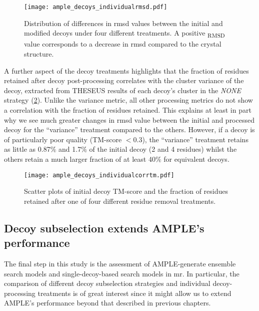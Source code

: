 \begin{figure}[H]
	\centering
	\texttt{[image: ample\_decoys\_individualrmsd.pdf]}
        \caption[Difference in RMSD for individually processed decoys]{Distribution of differences in \gls{rmsd} values between the initial and modified decoys under four different treatments. A positive \textDelta\textsubscript{RMSD} value corresponds to a decrease in \gls{rmsd} compared to the crystal structure.}
	\label{fig:ample_decoys_individualrmsd}
\end{figure}

A further aspect of the decoy treatments highlights that the fraction of residues retained after decoy post-processing correlates with the cluster variance of the decoy, extracted from THESEUS results of each decoy's cluster in the \textit{NONE} strategy (\cref{fig:ample_decoys_individualcorrtm}). Unlike the variance metric, all other processing metrics do not show a correlation with the fraction of residues retained. This explains at least in part why we see much greater changes in \gls{rmsd} value between the initial and processed decoy for the ``variance'' treatment compared to the others. However, if a decoy is of particularly poor quality (TM-score $<0.3$), the ``variance'' treatment retains as little as 0.87\% and 1.7\% of the initial decoy (2 and 4 residues) whilst the others retain a much larger fraction of at least 40\% for equivalent decoys.

\begin{figure}[H]
        \centering
        \texttt{[image: ample\_decoys\_individualcorrtm.pdf]}
        \caption[Relationship between decoy quality and fraction of residues retained]{Scatter plots of initial decoy TM-score and the fraction of residues retained after one of four different residue removal treatments.}
        \label{fig:ample_decoys_individualcorrtm}
\end{figure}

\subsection{Decoy subselection extends AMPLE's performance}
The final step in this study is the assessment of AMPLE-generate ensemble search models and single-decoy-based search models in \gls{mr}. In particular, the comparison of different decoy subselection strategies and individual decoy-processing treatments is of great interest since it might allow us to extend AMPLE's performance beyond that described in previous chapters.


